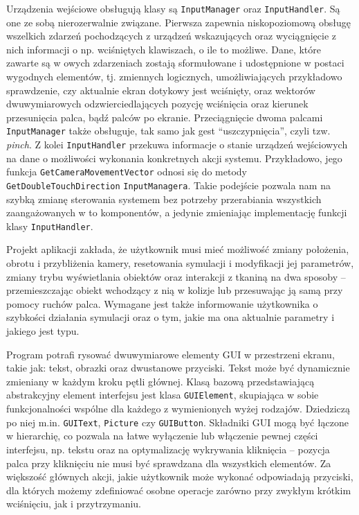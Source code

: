		Urządzenia wejściowe obsługują klasy są \texttt{InputManager} oraz \texttt{InputHandler}. Są one ze sobą nierozerwalnie związane. Pierwsza zapewnia niskopoziomową obsługę wszelkich zdarzeń pochodzących z urządzeń wskazujących oraz wyciągnięcie z nich informacji o np. wciśniętych klawiszach, o ile to możliwe. Dane, które zawarte są w owych zdarzeniach zostają sformułowane i udostępnione w postaci wygodnych elementów, tj. zmiennych logicznych, umożliwiających przykładowo sprawdzenie, czy aktualnie ekran dotykowy jest wciśnięty, oraz wektorów dwuwymiarowych odzwierciedlających pozycję wciśnięcia oraz kierunek przesunięcia palca, bądź palców po ekranie. Przeciągnięcie dwoma palcami \texttt{InputManager} także obsługuje, tak samo jak gest ``uszczypnięcia'', czyli tzw. \emph{pinch}. Z kolei \texttt{InputHandler} przekuwa informacje o stanie urządzeń wejściowych na dane o możliwości wykonania konkretnych akcji systemu. Przykładowo, jego funkcja \texttt{GetCameraMovementVector} odnosi się do metody \texttt{GetDoubleTouchDirection} \texttt{InputManagera}. Takie podejście pozwala nam na szybką zmianę sterowania systemem bez potrzeby przerabiania wszystkich zaangażowanych w to komponentów, a jedynie zmieniając implementację funkcji klasy \texttt{InputHandler}. 
		
		Projekt aplikacji zakłada, że użytkownik musi mieć możliwość zmiany położenia, obrotu i przybliżenia kamery, resetowania symulacji i modyfikacji jej parametrów, zmiany trybu wyświetlania obiektów oraz interakcji z tkaniną na dwa sposoby -- przemieszczając obiekt wchodzący z nią w kolizje lub przesuwając ją samą przy pomocy ruchów palca. Wymagane jest także informowanie użytkownika o szybkości działania symulacji oraz o tym, jakie ma ona aktualnie parametry i jakiego jest typu. 
		
		Program potrafi rysować dwuwymiarowe elementy GUI w przestrzeni ekranu, takie jak: tekst, obrazki oraz dwustanowe przyciski.
		Tekst może być dynamicznie zmieniany w każdym kroku pętli głównej. Klasą bazową przedstawiającą abstrakcyjny element interfejsu jest klasa \texttt{GUIElement}, skupiająca w sobie funkcjonalności wspólne dla każdego z wymienionych wyżej rodzajów. Dziedziczą po niej m.in. \texttt{GUIText}, \texttt{Picture} czy \texttt{GUIButton}. Składniki GUI mogą być łączone w hierarchię, co pozwala na łatwe wyłączenie lub włączenie pewnej części interfejsu, np. tekstu oraz na optymalizację wykrywania kliknięcia -- pozycja palca przy kliknięciu nie musi być sprawdzana dla wszystkich elementów. Za większość głównych akcji, jakie użytkownik może wykonać odpowiadają przyciski, dla których możemy zdefiniować osobne operacje zarówno przy zwykłym krótkim wciśnięciu, jak i przytrzymaniu.
		
